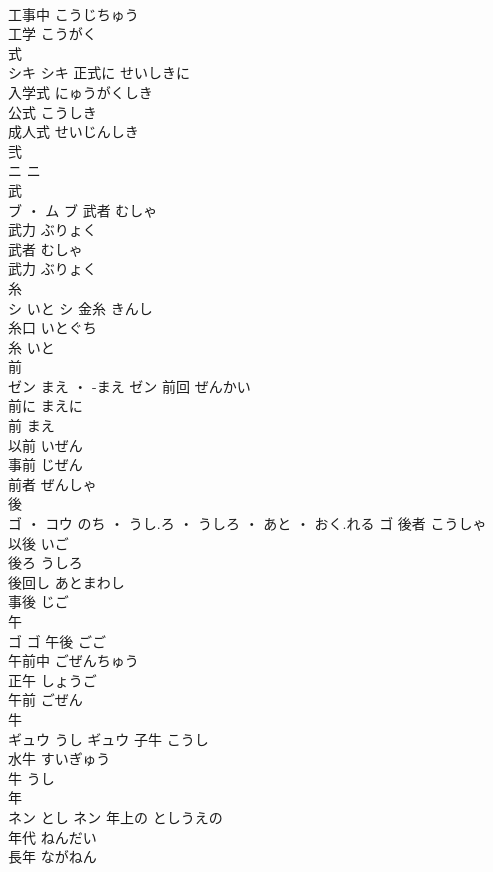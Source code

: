 \documentclass[8pt]{extreport}
\begin{document}
\begin{CJK}{UTF8}{min}
\\	工事中	こうじちゅう	
\\	工学	こうがく	
\\	式	
\\	シキ		シキ	正式に	せいしきに	
\\	入学式	にゅうがくしき	
\\	公式	こうしき	
\\	成人式	せいじんしき	
\\	弐	
\\	ニ		ニ																																			
\\	武	
\\	ブ ・ ム		ブ	武者	むしゃ	
\\	武力	ぶりょく	
\\	武者	むしゃ	
\\	武力	ぶりょく	
\\	糸	
\\	シ	いと	シ	金糸	きんし	
\\	糸口	いとぐち	
\\	糸	いと	
\\	前	
\\	ゼン	まえ ・ -まえ	ゼン	前回	ぜんかい	
\\	前に	まえに	
\\	前	まえ	
\\	以前	いぜん	
\\	事前	じぜん	
\\	前者	ぜんしゃ	
\\	後	
\\	ゴ ・ コウ	のち ・ うし.ろ ・ うしろ ・ あと ・ おく.れる	ゴ	後者	こうしゃ	
\\	以後	いご	
\\	後ろ	うしろ	
\\	後回し	あとまわし	
\\	事後	じご	
\\	午	
\\	ゴ		ゴ													午後	ごご	
\\	午前中	ごぜんちゅう	
\\	正午	しょうご	
\\	午前	ごぜん	
\\	牛	
\\	ギュウ	うし	ギュウ	子牛	こうし	
\\	水牛	すいぎゅう	
\\	牛	うし	
\\	年	
\\	ネン	とし	ネン	年上の	としうえの	
\\	年代	ねんだい	
\\	長年	ながねん	

\end{CJK}
\end{document}
